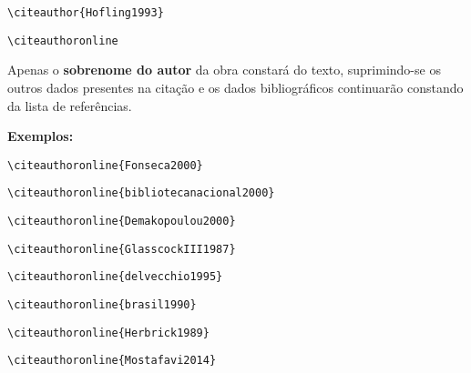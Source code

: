 \begin{alineas}
\begin{verbatim}
\citeauthor{Hofling1993}
\end{verbatim}
\citeauthor{Hofling1993}


\item
\begin{verbatim}
\citeauthoronline
\end{verbatim}

Apenas o \textbf{sobrenome do autor} da obra constará do texto, suprimindo-se os outros dados presentes na citação e os dados bibliográficos continuarão constando da lista de referências.

\textbf{Exemplos:}

\begin{verbatim}
\citeauthoronline{Fonseca2000}
\end{verbatim}

\begin{verbatim}
\citeauthoronline{bibliotecanacional2000}
\end{verbatim}

\begin{verbatim}
\citeauthoronline{Demakopoulou2000}
\end{verbatim}

\begin{verbatim}
\citeauthoronline{GlasscockIII1987}
\end{verbatim}

\begin{verbatim}
\citeauthoronline{delvecchio1995}
\end{verbatim}

\begin{verbatim}
\citeauthoronline{brasil1990}
\end{verbatim}

\begin{verbatim}
\citeauthoronline{Herbrick1989}
\end{verbatim}

\begin{verbatim}
\citeauthoronline{Mostafavi2014}
\end{verbatim}
\\


\end{alineas}
